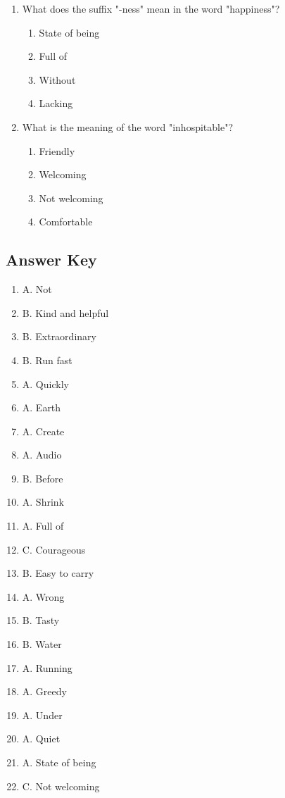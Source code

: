 \documentclass[12pt]{article}
\begin{document}
\begin{enumerate}
    \vspace{0.5cm}

    \item What does the suffix "-ness" mean in the word "happiness"?

    \begin{enumerate}[label=\Alph*.]
        \item State of being
        \item Full of
        \item Without
        \item Lacking
    \end{enumerate}
    
    \vspace{0.5cm}

    \item What is the meaning of the word "inhospitable"?

    \begin{enumerate}[label=\Alph*.]
        \item Friendly
        \item Welcoming
        \item Not welcoming
        \item Comfortable
    \end{enumerate}

\end{enumerate}
\newpage
\subsection*{Answer Key}

\begin{enumerate}
    \item A. Not
    \item B. Kind and helpful
    \item B. Extraordinary
    \item B. Run fast
    \item A. Quickly
    \item A. Earth
    \item A. Create
    \item A. Audio
    \item B. Before
    \item A. Shrink
    \item A. Full of
    \item C. Courageous
    \item B. Easy to carry
    \item A. Wrong
    \item B. Tasty
    \item B. Water
    \item A. Running
    \item A. Greedy
    \item A. Under
    \item A. Quiet
    \item A. State of being
    \item C. Not welcoming
\end{enumerate}
\end{document}
